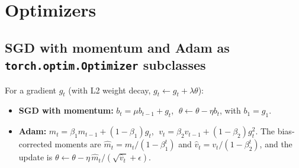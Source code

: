 \documentclass[11pt,a4paper]{article}
\begin{document}
\section{Optimizers}

\subsection{SGD with momentum and Adam as \texttt{torch.optim.Optimizer} subclasses}

For a gradient $g_t$ (with L2 weight decay, $g_t\leftarrow g_t+\lambda\theta$):
\begin{itemize}
  \item \textbf{SGD with momentum:} $b_t=\mu b_{t-1}+g_t$, $\;\theta\leftarrow\theta-\eta b_t$, with $b_1=g_1$.
  \item \textbf{Adam:} $m_t=\beta_1m_{t-1}+(1-\beta_1)g_t$, $\;v_t=\beta_2v_{t-1}+(1-\beta_2)g_t^2$. The bias-corrected moments are $\hat m_t=m_t/(1-\beta_1^t)$ and $\hat v_t=v_t/(1-\beta_2^t)$, and the update is $\theta\leftarrow\theta-\eta\,\hat m_t/(\sqrt{\hat v_t}+\epsilon)$.
\end{itemize}
\end{document}
